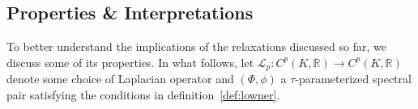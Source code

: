 \documentclass[10pt]{article}
\numberwithin{equation}{section}
\newcommand{\+}{%
	\raisebox{0.18ex}{\scaleobj{0.55}{+}}
}
\theoremstyle{definition}
\theoremstyle{definition}
\begin{document}
\subsection{Properties \& Interpretations}\label{sec:spri_properties}
To better understand the implications of the relaxations discussed so far, we discuss some of its properties. 
In what follows, let $\mathcal{L}_p : C^p(K, \mathbb{R}) \to C^p(K, \mathbb{R})$ denote some choice of Laplacian operator and $(\Phi, \phi)$ a $\tau$-parameterized spectral pair satisfying the conditions in definition~\ref{def:lowner}. 
\end{document}
